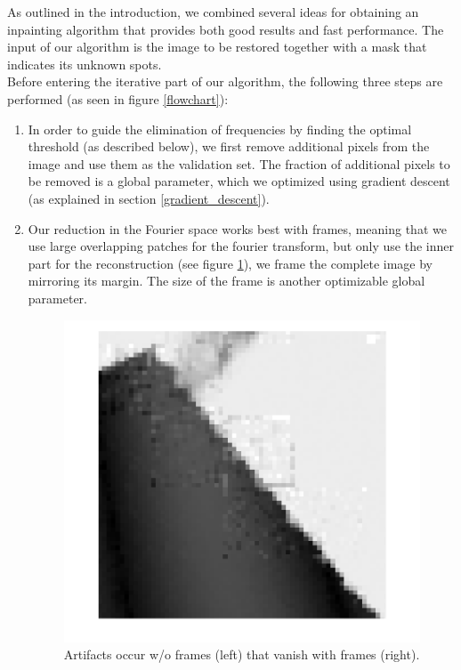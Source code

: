 \documentclass[10pt,conference,compsocconf]{IEEEtran}
\begin{document}
As outlined in the introduction, we combined several ideas for obtaining an inpainting algorithm that provides both good results and fast performance. The input of our algorithm is the image to be restored together with a mask that indicates its unknown spots.\\
Before entering the iterative part of our algorithm, the following three steps are performed (as seen in figure \ref{flowchart}):
\begin{enumerate}
\item In order to guide the elimination of frequencies by finding the optimal threshold (as described below), we first remove additional pixels from the image and use them as the validation set. The fraction of additional pixels to be removed is a global parameter, which we optimized using gradient descent (as explained in section \ref{gradient_descent}).
\item Our reduction in the Fourier space works best with frames, meaning that we use large overlapping patches for the fourier transform, but only use the inner part for the reconstruction (see figure \ref{framing_artifacts}), we frame the complete image by mirroring its margin. The size of the frame is another optimizable global parameter.

\begin{figure}
\centering
\includegraphics[width=\columnwidth]{images/framing_artifacts.png}
\caption{Artifacts occur w/o frames (left) that vanish with frames (right).} %
\label{framing_artifacts}
\end{figure}


\end{enumerate}
\end{document}

